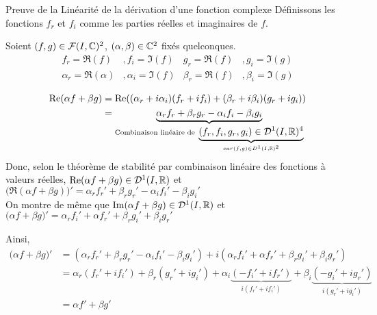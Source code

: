 \documentclass{article}
\begin{document}
\begin{question_kholle}{Preuve de la Linéarité de la dérivation d'une fonction complexe}
	Définissons les fonctions $f_r$ et $f_i$ comme les parties réelles et imaginaires de $f$.

	Soient $(f, g) \in \mathcal{F}(I, \mathbb C)^2$, $(\alpha, \beta) \in \mathbb C^2$ fixés quelconques.
	\begin{align*}
		f_r = \Re(f) &, f_i = \Im(f) &g_r = \Re(f) &, g_i = \Im(g)\\
		\alpha_r = \Re(\alpha) &, \alpha_i = \Im(f) &\beta_r = \Re(f) &, \beta_i = \Im(g)
	\end{align*}
	
	\begin{align*}
		\text{Re}( \alpha f + \beta g) &= \text{Re}((\alpha_r + i \alpha_i)(f_r + i f_i) + (\beta_r+ i\beta_i)(g_r+ i g_i)) \\
		&= \underbrace{\alpha_r f_r + \beta_r g_r - \alpha_i f_i - \beta_i g_i}_{\text{Combinaison linéaire de } \underbrace{(f_r, f_i, g_r, g_i) \in \mathcal D^1(I, \mathbb R)^4}_{car (f,g) \in D^1(I, \mathbb R)^2}}
	\end{align*}
	Donc, selon le théorème de stabilité par combinaison linéaire des fonctions à valeurs réelles, $\text{Re}(\alpha f + \beta g) \in \mathcal D^1(I, \mathbb R)$ et $\big(\Re(\alpha f + \beta g)\big)' = \alpha_r f_r' + \beta_r g_r' - \alpha_i f_i' - \beta_i g_i'$
	\\
	On montre de même que $\text{Im}(\alpha f + \beta g) \in \mathcal D^1(I, \mathbb R)$ et $\big(\alpha f + \beta g\big)' = \alpha_r f_i' +\alpha f_r' +\beta_r g_i' +\beta_i g_r'$
	
	Ainsi,
	\begin{align*}
		\big( \alpha f + \beta g \big)' &= (\alpha_r f_r' + \beta_r g_r' - \alpha_i f_i' - \beta_i g_i') + i (\alpha_r f_i' +\alpha f_r' +\beta_r g_i' +\beta_i g_r') \\
		&= \alpha_r(f_r' + if_i') + \beta_r(g_r' + ig_i') + \alpha_i \underbrace{(-f_i' + if_r')}_{i(f_r' + if_i')} + \beta_i \underbrace{( -g_i' + ig_r')}_{i(g_r' + ig_i')} \\
		&=\alpha f' + \beta g'
	\end{align*}
\end{question_kholle}
\end{document}
